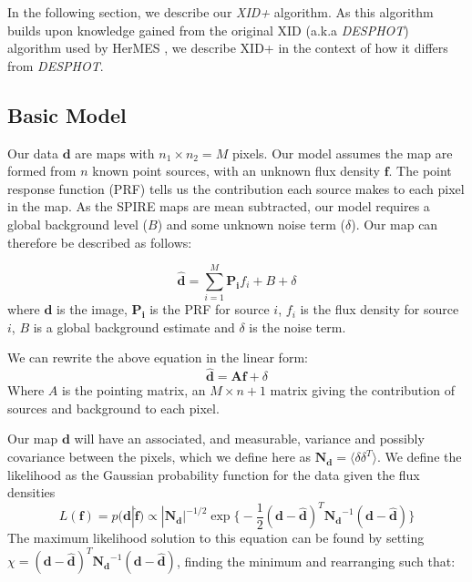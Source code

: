 \documentclass[useAMS,usenatbib]{mnras}
\begin{document}
In the following section, we describe our \emph{XID+} algorithm. As this algorithm builds upon knowledge gained from the original XID (a.k.a \emph{DESPHOT}) algorithm used by HerMES \citep{Roseboom:2010, Roseboom:2011, Wang:2014}, we describe XID+ in the context of how it differs from \emph{DESPHOT}. 


\subsection{Basic Model}
Our data $\mathbf{d}$ are maps with $n_1 \times n_2 = M$ pixels. Our model assumes the map are formed from $n$ known point sources, with an unknown flux density $\mathbf{f}$. The point response function (PRF) tells us the contribution each source makes to each pixel in the map. As the SPIRE maps are mean subtracted, our model requires a global background level ($B$) and some unknown noise term ($\delta$). Our map can therefore be described as follows:

\begin{equation}
\hat{\mathbf{d}} = \sum\limits_{i=1}^M \mathbf{P_i}f_i + B + \delta
\label{eq:map}
\end{equation}
where $\mathbf{d}$ is the image, $\mathbf{P_i}$ is the PRF for source $i$, $f_i$ is the flux density for source $i$, $B$ is a global background estimate and $\delta$ is the noise term.

We can rewrite the above equation in the linear form:
\begin{equation}
\hat{\mathbf{d}} = \mathbf{Af} + \delta
\label{eq:map2}
\end{equation}
Where $A$ is the pointing matrix, an $M \times n+1$ matrix giving the contribution of sources and background to each pixel.

Our map $\mathbf{d}$ will have an associated, and measurable, variance and possibly covariance between the pixels, which we define here as $\mathbf{N_d} = \langle\delta\delta^T\rangle$. We define the likelihood as the Gaussian probability function for the data given the flux densities
\begin{equation}
L(\mathbf{f}) = p(\mathbf{d}|\hat{\mathbf{f}}) \propto |\mathbf{N_d}|^{-1/2} \exp\big\{ -\frac{1}{2}(\mathbf{d}-\hat{\mathbf{d}})^T\mathbf{N_d}^{-1}(\mathbf{d}-\hat{\mathbf{d}})\big\}\label{eq:likelihood}
\end{equation}
The maximum likelihood solution to this equation can be found by setting $\chi = (\mathbf{d}-\hat{\mathbf{d}})^T\mathbf{N_d}^{-1}(\mathbf{d}-\hat{\mathbf{d}})$, finding the minimum and rearranging such that:
\end{document}
